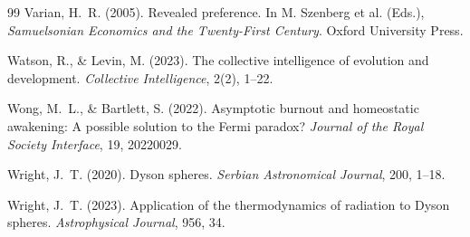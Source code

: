 \documentclass[11pt,twocolumn]{article}
\begin{document}
\begin{thebibliography}{99}
 Varian, H.~R. (2005). Revealed preference. In M. Szenberg et al. (Eds.), \emph{Samuelsonian Economics and the Twenty-First Century}. Oxford University Press.

 Watson, R., \& Levin, M. (2023). The collective intelligence of evolution and development. \emph{Collective Intelligence}, 2(2), 1--22.

 Wong, M.~L., \& Bartlett, S. (2022). Asymptotic burnout and homeostatic awakening: A possible solution to the Fermi paradox? \emph{Journal of the Royal Society Interface}, 19, 20220029.

 Wright, J.~T. (2020). Dyson spheres. \emph{Serbian Astronomical Journal}, 200, 1--18.

 Wright, J.~T. (2023). Application of the thermodynamics of radiation to Dyson spheres. \emph{Astrophysical Journal}, 956, 34.

\end{thebibliography}
\end{document}
